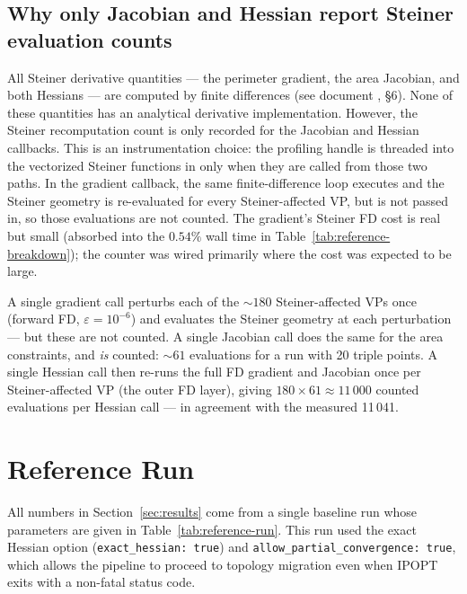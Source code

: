 \documentclass[11pt,a4paper]{article}
\begin{document}
\subsection{Why only Jacobian and Hessian report Steiner evaluation counts}

All Steiner derivative quantities --- the perimeter gradient, the area
Jacobian, and both Hessians --- are computed by finite differences (see
document , \S{}6).  None of these
quantities has an analytical derivative implementation.  However, the
Steiner recomputation count is only recorded for the Jacobian and
Hessian callbacks.  This is an instrumentation choice: the profiling
handle  is threaded into the vectorized Steiner functions in
 only when they are called
from those two paths.  In the gradient callback, the same finite-difference
loop executes and the Steiner geometry is re-evaluated for every
Steiner-affected VP, but  is not passed in, so those
evaluations are not counted.  The gradient's Steiner FD cost is real but
small (absorbed into the $0.54\%$ wall time in
Table~\ref{tab:reference-breakdown}); the counter was wired primarily
where the cost was expected to be large.

\begin{remark}
A single gradient call perturbs each of the $\sim\!180$ Steiner-affected
VPs once (forward FD, $\varepsilon = 10^{-6}$) and evaluates the Steiner
geometry at each perturbation --- but these are not counted.  A single
Jacobian call does the same for the area constraints, and \emph{is}
counted: $\sim\!61$ evaluations for a run with 20 triple points.  A
single Hessian call then re-runs the full FD gradient and Jacobian once
per Steiner-affected VP (the outer FD layer), giving
$180 \times 61 \approx 11\,000$ counted evaluations per Hessian call ---
in agreement with the measured 11\,041.
\end{remark}

\section{Reference Run}
\label{sec:ref-run}

All numbers in Section~\ref{sec:results} come from a single baseline
run whose parameters are given in Table~\ref{tab:reference-run}.  This
run used the exact Hessian option (\texttt{exact\_hessian: true}) and
\texttt{allow\_partial\_convergence: true}, which allows the pipeline to
proceed to topology migration even when IPOPT exits with a non-fatal
status code.
\end{document}
